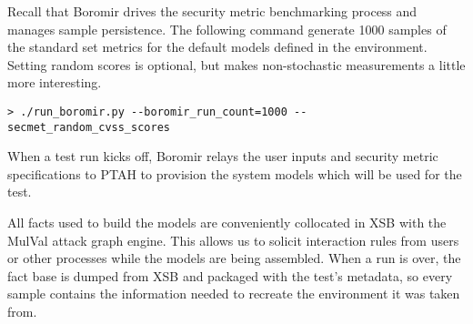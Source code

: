 



Recall that Boromir drives the security metric benchmarking process and manages sample persistence. The following command generate 1000 samples of the standard set metrics for the default models defined in the environment. Setting random scores is optional, but makes non-stochastic measurements a little more interesting.

 \begin{verbatim}> ./run_boromir.py --boromir_run_count=1000 --secmet_random_cvss_scores\end{verbatim} 

When a test run kicks off, Boromir relays the user inputs and security metric specifications to PTAH to provision the system models which will be used for the test.

All facts used to build the models are conveniently collocated in XSB with the MulVal\cite{Ou_Appel_2005} attack graph engine. This allows us to solicit interaction rules from users or other processes while the models are being assembled. When a run is over, the fact base is dumped from XSB and packaged with the test's metadata, so every sample contains the information needed to recreate the environment it was taken from. 





